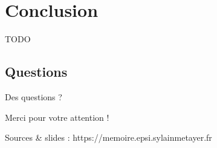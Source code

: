 \section{Conclusion}
\begin{frame}{\secname}
TODO
\end{frame}

\subsection{Questions}
\begin{frame}{Des questions ?}

Merci pour votre attention !

Sources \& slides : https://memoire.epsi.sylainmetayer.fr

\centering {}

\end{frame}
